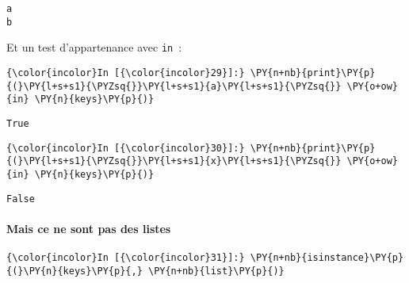     \begin{Verbatim}[commandchars=\\\{\},frame=single,framerule=0.3mm,rulecolor=\color{cellframecolor}]
a
b
\end{Verbatim}

    Et un test d'appartenance avec \texttt{in}~:

    \begin{Verbatim}[commandchars=\\\{\},frame=single,framerule=0.3mm,rulecolor=\color{cellframecolor}]
{\color{incolor}In [{\color{incolor}29}]:} \PY{n+nb}{print}\PY{p}{(}\PY{l+s+s1}{\PYZsq{}}\PY{l+s+s1}{a}\PY{l+s+s1}{\PYZsq{}} \PY{o+ow}{in} \PY{n}{keys}\PY{p}{)}
\end{Verbatim}


    \begin{Verbatim}[commandchars=\\\{\},frame=single,framerule=0.3mm,rulecolor=\color{cellframecolor}]
True
\end{Verbatim}

    \begin{Verbatim}[commandchars=\\\{\},frame=single,framerule=0.3mm,rulecolor=\color{cellframecolor}]
{\color{incolor}In [{\color{incolor}30}]:} \PY{n+nb}{print}\PY{p}{(}\PY{l+s+s1}{\PYZsq{}}\PY{l+s+s1}{x}\PY{l+s+s1}{\PYZsq{}} \PY{o+ow}{in} \PY{n}{keys}\PY{p}{)}
\end{Verbatim}


    \begin{Verbatim}[commandchars=\\\{\},frame=single,framerule=0.3mm,rulecolor=\color{cellframecolor}]
False
\end{Verbatim}

    \hypertarget{mais-ce-ne-sont-pas-des-listes}{%
\paragraph{\texorpdfstring{Mais \textbf{ce ne sont pas des
listes}}{Mais ce ne sont pas des listes}}\label{mais-ce-ne-sont-pas-des-listes}}

    \begin{Verbatim}[commandchars=\\\{\},frame=single,framerule=0.3mm,rulecolor=\color{cellframecolor}]
{\color{incolor}In [{\color{incolor}31}]:} \PY{n+nb}{isinstance}\PY{p}{(}\PY{n}{keys}\PY{p}{,} \PY{n+nb}{list}\PY{p}{)}
\end{Verbatim}


